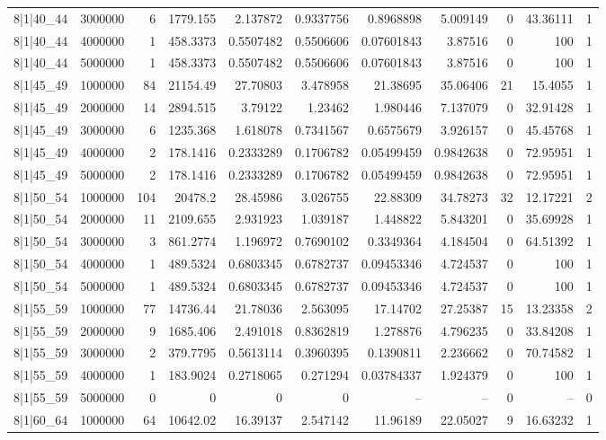 \begin{tabular}{lrrrrrrrrrr}
8|1|40\_44 & 3000000 & 6 & 1779.155 & 2.137872 & 0.9337756 & 0.8968898 & 5.009149 & 0 & 43.36111 & 1 \\
8|1|40\_44 & 4000000 & 1 & 458.3373 & 0.5507482 & 0.5506606 & 0.07601843 & 3.87516 & 0 & 100 & 1 \\
8|1|40\_44 & 5000000 & 1 & 458.3373 & 0.5507482 & 0.5506606 & 0.07601843 & 3.87516 & 0 & 100 & 1 \\
8|1|45\_49 & 1000000 & 84 & 21154.49 & 27.70803 & 3.478958 & 21.38695 & 35.06406 & 21 & 15.4055 & 1 \\
8|1|45\_49 & 2000000 & 14 & 2894.515 & 3.79122 & 1.23462 & 1.980446 & 7.137079 & 0 & 32.91428 & 1 \\
8|1|45\_49 & 3000000 & 6 & 1235.368 & 1.618078 & 0.7341567 & 0.6575679 & 3.926157 & 0 & 45.45768 & 1 \\
8|1|45\_49 & 4000000 & 2 & 178.1416 & 0.2333289 & 0.1706782 & 0.05499459 & 0.9842638 & 0 & 72.95951 & 1 \\
8|1|45\_49 & 5000000 & 2 & 178.1416 & 0.2333289 & 0.1706782 & 0.05499459 & 0.9842638 & 0 & 72.95951 & 1 \\
8|1|50\_54 & 1000000 & 104 & 20478.2 & 28.45986 & 3.026755 & 22.88309 & 34.78273 & 32 & 12.17221 & 2 \\
8|1|50\_54 & 2000000 & 11 & 2109.655 & 2.931923 & 1.039187 & 1.448822 & 5.843201 & 0 & 35.69928 & 1 \\
8|1|50\_54 & 3000000 & 3 & 861.2774 & 1.196972 & 0.7690102 & 0.3349364 & 4.184504 & 0 & 64.51392 & 1 \\
8|1|50\_54 & 4000000 & 1 & 489.5324 & 0.6803345 & 0.6782737 & 0.09453346 & 4.724537 & 0 & 100 & 1 \\
8|1|50\_54 & 5000000 & 1 & 489.5324 & 0.6803345 & 0.6782737 & 0.09453346 & 4.724537 & 0 & 100 & 1 \\
8|1|55\_59 & 1000000 & 77 & 14736.44 & 21.78036 & 2.563095 & 17.14702 & 27.25387 & 15 & 13.23358 & 2 \\
8|1|55\_59 & 2000000 & 9 & 1685.406 & 2.491018 & 0.8362819 & 1.278876 & 4.796235 & 0 & 33.84208 & 1 \\
8|1|55\_59 & 3000000 & 2 & 379.7795 & 0.5613114 & 0.3960395 & 0.1390811 & 2.236662 & 0 & 70.74582 & 1 \\
8|1|55\_59 & 4000000 & 1 & 183.9024 & 0.2718065 & 0.271294 & 0.03784337 & 1.924379 & 0 & 100 & 1 \\
8|1|55\_59 & 5000000 & 0 & 0 & 0 & 0 & -- & -- & 0 & -- & 0 \\
8|1|60\_64 & 1000000 & 64 & 10642.02 & 16.39137 & 2.547142 & 11.96189 & 22.05027 & 9 & 16.63232 & 1 \\

\end{tabular}
